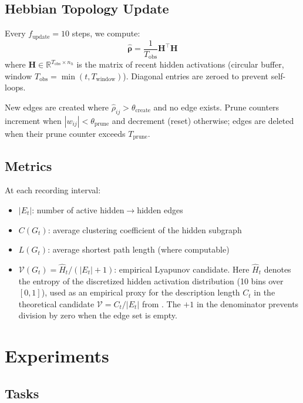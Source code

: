 \documentclass[12pt]{article}
\begin{document}
\subsection{Hebbian Topology Update}

Every $f_{\text{update}} = 10$ steps, we compute:
\begin{equation}
\hat{\boldsymbol{\rho}} = \frac{1}{T_{\text{obs}}} \mathbf{H}^\top \mathbf{H}
\end{equation}
where $\mathbf{H} \in \mathbb{R}^{T_{\text{obs}} \times n_h}$ is the matrix of recent hidden activations (circular buffer, window $T_{\text{obs}} = \min(t, T_{\text{window}})$). Diagonal entries are zeroed to prevent self-loops.

New edges are created where $\hat{\rho}_{ij} > \theta_{\text{create}}$ and no edge exists. Prune counters increment when $|w_{ij}| < \theta_{\text{prune}}$ and decrement (reset) otherwise; edges are deleted when their prune counter exceeds $T_{\text{prune}}$.

\subsection{Metrics}
\label{sec:metrics}

At each recording interval:
\begin{itemize}
    \item $|E_t|$: number of active hidden$\to$hidden edges
    \item $C(G_t)$: average clustering coefficient of the hidden subgraph
    \item $L(G_t)$: average shortest path length (where computable)
    \item $\mathcal{V}(G_t) = \hat{H}_t / (|E_t| + 1)$: empirical Lyapunov candidate. Here $\hat{H}_t$ denotes the entropy of the discretized hidden activation distribution (10 bins over $[0,1]$), used as an empirical proxy for the description length $C_t$ in the theoretical candidate $\mathcal{V} = C_t / |E_t|$ from \cite{lin2026fluid}. The $+1$ in the denominator prevents division by zero when the edge set is empty.
\end{itemize}

\section{Experiments}

\subsection{Tasks}
\end{document}
